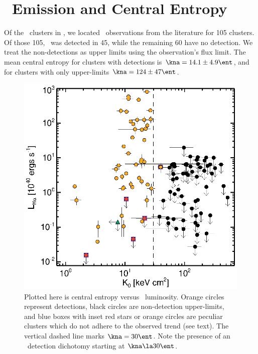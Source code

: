 \documentclass{emulateapj}
\begin{document}
\section{\halpha\ Emission and Central Entropy}
\label{sec:sf}

Of the \clnum\ clusters in \accept, we located \halpha\ observations
from the literature for 105 clusters. Of those 105, \halpha\ was
detected in 45, while the remaining 60 have no detection. We treat the
non-detections as upper limits using the observation's flux limit.  The
mean central entropy for clusters with detections is $\kna = 14.1 \pm
4.9 \ent$, and for clusters with only upper-limits $\kna = 124 \pm 47
\ent$.

\begin{figure}
  \begin{center}
    \includegraphics*[width=\columnwidth, trim=28mm 7mm 40mm 17mm, clip]{ha}
    \caption{Plotted here is central entropy versus
      \halpha\ luminosity. Orange circles represent detections, black
      circles are non-detection upper-limits, and blue boxes with
      inset red stars or orange circles are peculiar clusters which do
      not adhere to the observed trend (see text). The vertical dashed
      line marks $\kna = 30 \ent$.  Note the presence of an
      \halpha\ detection dichotomy starting at $\kna \la 30 \ent$.}
    \label{fig:ha}
  \end{center}
\end{figure}
\end{document}
